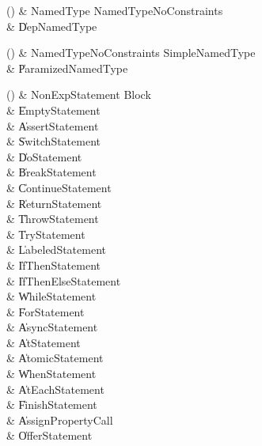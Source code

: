 \begin{bbgrammarappendix}

() & NamedType \label{prod:NamedType}  \: NamedTypeNoConstraints  \\

 &    \| DepNamedType \\

\end{bbgrammarappendix}

\begin{bbgrammarappendix}

() & NamedTypeNoConstraints \label{prod:NamedTypeNoConstraints}  \: SimpleNamedType  \\

 &    \| ParamizedNamedType \\

\end{bbgrammarappendix}

\begin{bbgrammarappendix}

() & NonExpStatement \label{prod:NonExpStatement}  \: Block  \\

 &    \| EmptyStatement \\
 &    \| AssertStatement \\
 &    \| SwitchStatement \\
 &    \| DoStatement \\
 &    \| BreakStatement \\
 &    \| ContinueStatement \\
 &    \| ReturnStatement \\
 &    \| ThrowStatement \\
 &    \| TryStatement \\
 &    \| LabeledStatement \\
 &    \| IfThenStatement \\
 &    \| IfThenElseStatement \\
 &    \| WhileStatement \\
 &    \| ForStatement \\
 &    \| AsyncStatement \\
 &    \| AtStatement \\
 &    \| AtomicStatement \\
 &    \| WhenStatement \\
 &    \| AtEachStatement \\
 &    \| FinishStatement \\
 &    \| AssignPropertyCall \\
 &    \| OfferStatement \\

\end{bbgrammarappendix}

